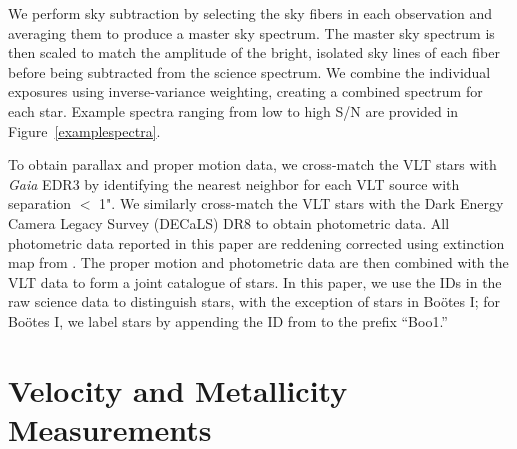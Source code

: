 \documentclass[twocolumn]{aastex63}
\begin{document}
We perform sky subtraction by selecting the sky fibers in each observation and averaging them to produce a master sky spectrum. The master sky spectrum is then scaled to match the amplitude of the bright, isolated sky lines of each fiber before being subtracted from the science spectrum. We combine the individual exposures using inverse-variance weighting, creating a combined spectrum for each star. Example spectra ranging from low to high S/N are provided in Figure~\ref{examplespectra}.

To obtain parallax and proper motion data, we cross-match the VLT stars with {\it Gaia} EDR3 \citep{pru2016, bro2020} by identifying the nearest neighbor for each VLT source with separation $<$ 1". We similarly cross-match the VLT stars with the Dark Energy Camera Legacy Survey (DECaLS) DR8 \citep{Dey:2018} to obtain photometric data. All photometric data reported in this paper are reddening corrected using extinction map from \citet{Schlegel:1998}.  The proper motion and photometric data are then combined with the VLT data to form a joint catalogue of stars. In this paper, we use the IDs in the raw science data to distinguish stars, with the exception of stars in Bo{\"o}tes I; for Bo{\"o}tes I, we label stars by appending the ID from \citet{kop2011} to the prefix ``Boo1.''

\section{Velocity and Metallicity Measurements}
\label{sec:measurements}
\end{document}
